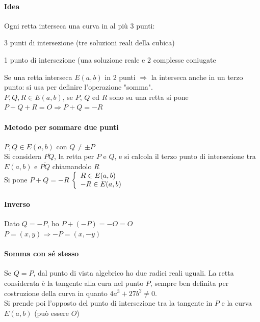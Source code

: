 \documentclass[10pt]{book}
\begin{document}
\paragraph{Idea} Ogni retta interseca una curva in al più 3 punti:
\begin{list}{}{}
	\item 3 punti di intersezione (tre soluzioni reali della cubica)
	\item 1 punto di intersezione (una soluzione reale e 2 complesse coniugate
\end{list}
Se una retta interseca $E(a,b)$ in 2 punti $\Rightarrow$ la interseca anche in un terzo punto: si usa per definire l'operazione "somma".\\
$P,Q,R\in E(a,b)$, se $P$, $Q$ ed $R$ sono su una retta si pone $P+Q+R = O \Rightarrow P + Q = -R$
\pagebreak
\begin{multicols}{2}
\paragraph{Metodo per sommare due punti} $P,Q\in E(a,b)$ con $Q\neq \pm P$\\
Si considera $\overline{PQ}$, la retta per $P$ e $Q$, e si calcola il terzo punto di intersezione tra $E(a,b)$ e $\overline{PQ}$ chiamandolo $R$\\
Si pone $P+Q = -R$ $\left\{\begin{array}{l l}
R \in E(a,b)\\
-R \in E(a,b)
\end{array}\right.$
\paragraph{Inverso} Dato $Q = -P$, ho $P + (-P) = -O = O$\\
$P = (x,y)\Rightarrow -P=(x,-y)$
\paragraph{Somma con sé stesso} Se $Q = P$, dal punto di vista algebrico ho due radici reali uguali. La retta considerata è la tangente alla cura nel punto $P$, sempre ben definita per costruzione della curva in quanto $4a^3 + 27b^2 \neq 0$.\\
Si prende poi l'opposto del punto di intersezione tra la tangente in $P$ e la curva $E(a,b)$ (può essere $O$)

\end{multicols}
\end{document}
